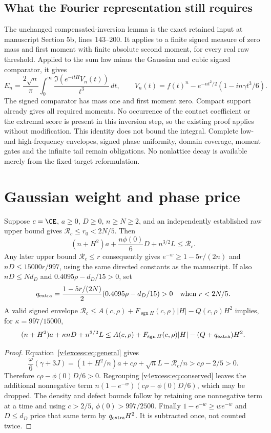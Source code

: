 \subsection{What the Fourier representation still requires}
The unchanged compensated-inversion lemma is the exact retained input
at manuscript Section 5b, lines 143--200. It applies to a finite signed
measure of zero mass and first moment with finite absolute second moment,
for every real raw threshold. Applied to the sum law minus the Gaussian
and cubic signed comparator, it gives
\[
 E_n=\frac{2\sqrt n}{\pi}\int_0^\infty
     \frac{\Im(e^{-itH}V_n(t))}{t^3}\,dt,
 \qquad V_n(t)=f(t)^n-e^{-nt^2/2}(1-in\gamma t^3/6).
\]
The signed comparator has mass one and first moment zero. Compact support
already gives all required moments. No occurrence of the contact
coefficient or the extremal score is present in this inversion step, so
the existing proof applies without modification.
This identity does not bound the integral. Complete low- and
high-frequency envelopes, signed phase uniformity, domain coverage,
moment gates and the infinite tail remain obligations. No nonlattice
decay is available merely from the fixed-target reformulation.

\section{Gaussian weight and phase price}
\begin{corollary}\label{v4excess:cor:weight}
Suppose $c=\CE$, $a\ge0$, $D\ge0$, $n\ge N\ge2$, and an independently
established raw upper bound gives $\mathcal R_c\le r_0<2N/5$. Then
\[
 (n+H^2)a+\frac{n\phi(0)}6D+n^{3/2}L\le\mathcal R_c.
\]
Any later upper bound $\mathcal R_c\le r$ consequently gives
$e^{-w}\ge1-5r/(2n)$ and $nD\le15000r/997$, using the same directed
constants as the manuscript. If also $nD\le Nd_D$ and
$0.4095\rho-d_D/15>0$, set
\[
 q_{\rm extra}=\frac{1-5r/(2N)}2(0.4095\rho-d_D/15)>0
 \quad\text{when } r<2N/5.
\]
A valid signed envelope
$\mathcal R_c\le A(c,\rho)+F_{\operatorname{sgn}H}(c,\rho)|H|
-Q(c,\rho)H^2$ implies, for $\kappa=997/15000$,
\[
 (n+H^2)a+\kappa nD+n^{3/2}L
 \le A(c,\rho)+F_{\operatorname{sgn}H}(c,\rho)|H|
                       -(Q+q_{\rm extra})H^2.
\]
\end{corollary}
\begin{proof}
Equation~\eqref{v4excess:eq:general} gives
\[
 \frac{\varphi}{6}(\gamma+3J)
 =(1+H^2/n)a+c\rho+\sqrt nL-\mathcal R_c/n
 >c\rho-2/5>0.
\]
Therefore $c\rho-\phi(0)D/6>0$. Regrouping
\eqref{v4excess:eq:conserved} leaves the additional nonnegative term
$n(1-e^{-w})(c\rho-\phi(0)D/6)$, which may be dropped. The density and
defect bounds follow by retaining one nonnegative term at a time and
using $c>2/5$, $\phi(0)>997/2500$. Finally
$1-e^{-w}\ge we^{-w}$ and $D\le d_D$ price that same term by
$q_{\rm extra}H^2$. It is subtracted once, not counted twice.
\end{proof}

